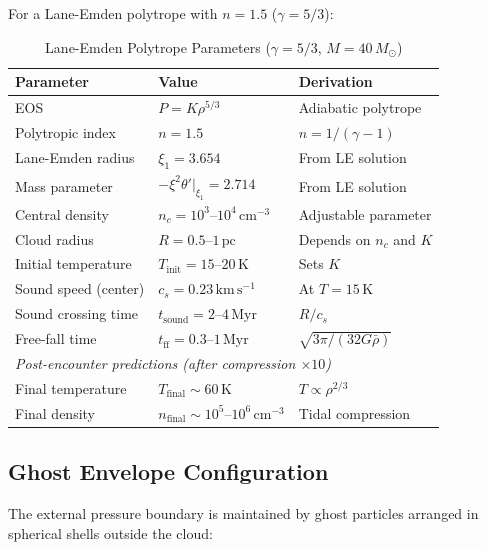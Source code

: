 \documentclass[11pt,a4paper]{article}
\newcommand{\Msun}{M_\odot}
\newcommand{\kms}{\,\mathrm{km\,s^{-1}}}
\newcommand{\pc}{\,\mathrm{pc}}
\newcommand{\cmcubed}{\,\mathrm{cm^{-3}}}
\begin{document}
For a Lane-Emden polytrope with $n = 1.5$ ($\gamma = 5/3$):

\begin{table}[h]
\centering
\caption{Lane-Emden Polytrope Parameters ($\gamma = 5/3$, $M = 40\,\Msun$)}
\begin{tabular}{lll}
\toprule
\textbf{Parameter} & \textbf{Value} & \textbf{Derivation} \\
\midrule
EOS & $P = K\rho^{5/3}$ & Adiabatic polytrope \\
Polytropic index & $n = 1.5$ & $n = 1/(\gamma - 1)$ \\
Lane-Emden radius & $\xi_1 = 3.654$ & From LE solution \\
Mass parameter & $-\xi^2 \theta'|_{\xi_1} = 2.714$ & From LE solution \\
\midrule
Central density & $n_c = 10^3$--$10^4\cmcubed$ & Adjustable parameter \\
Cloud radius & $R = 0.5$--$1\pc$ & Depends on $n_c$ and $K$ \\
Initial temperature & $T_\mathrm{init} = 15$--$20\,\mathrm{K}$ & Sets $K$ \\
\midrule
Sound speed (center) & $c_s = 0.23\kms$ & At $T = 15\,\mathrm{K}$ \\
Sound crossing time & $t_\mathrm{sound} = 2$--$4\,\mathrm{Myr}$ & $R/c_s$ \\
Free-fall time & $t_\mathrm{ff} = 0.3$--$1\,\mathrm{Myr}$ & $\sqrt{3\pi/(32 G \bar{\rho})}$ \\
\midrule
\multicolumn{3}{l}{\textit{Post-encounter predictions (after compression $\times 10$)}} \\
Final temperature & $T_\mathrm{final} \sim 60\,\mathrm{K}$ & $T \propto \rho^{2/3}$ \\
Final density & $n_\mathrm{final} \sim 10^5$--$10^6\cmcubed$ & Tidal compression \\
\bottomrule
\end{tabular}
\end{table}

\subsection{Ghost Envelope Configuration}

The external pressure boundary is maintained by ghost particles arranged in
spherical shells outside the cloud:
\end{document}
